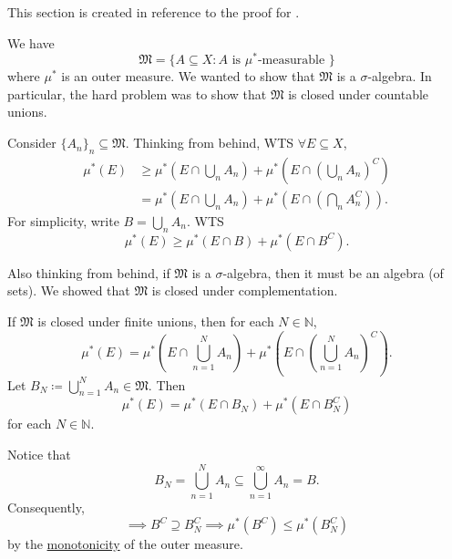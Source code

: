 \documentclass[notoc,notitlepage]{tufte-book}
\begin{document}
This section is created in reference to
the proof for .

We have
\begin{equation*}
  \mathfrak{M} = \{ A \subseteq X : A \text{ is } \mu^*\text{-measurable } \}
\end{equation*}
where $\mu^*$ is an outer measure.
We wanted to show that $\mathfrak{M}$ is a $\sigma$-algebra.
In particular, the hard problem was to show that
$\mathfrak{M}$ is closed under countable unions.

Consider $\{ A_n \}_{n} \subseteq \mathfrak{M}$.
Thinking from behind, WTS $\forall E \subseteq X$,
\begin{align*}
  \mu^*(E)
  &\geq \mu^* \left( E \cap \bigcup_{n} A_n \right)
    + \mu^* \left( E \cap \left( \bigcup_{n} A_n \right)^C \right) \\
  &= \mu^* \left( E \cap \bigcup_{n} A_n \right)
    + \mu^* \left( E \cap \left( \bigcap_{n} A_n^C \right) \right).
\end{align*}
For simplicity, write $B = \bigcup_{n} A_n$.
WTS
\begin{equation}\tag{$*$}\label{eq:appendix_1_eq_1}
  \mu^*(E) \geq \mu^*(E \cap B) + \mu^*(E \cap B^C).
\end{equation}

Also thinking from behind,
if $\mathfrak{M}$ is a $\sigma$-algebra, 
then it must be an algebra (of sets).
We showed that $\mathfrak{M}$ is closed under complementation.

If $\mathfrak{M}$ is closed under finite unions,
then for each $N \in \mathbb{N}$,
\begin{equation*}
  \mu^*(E) = \mu^* \left( E \cap \bigcup_{n=1}^{N} A_n \right)
    + \mu^* \left( E \cap \left( \bigcup_{n=1}^{N} A_n \right)^C \right).
\end{equation*}
Let $B_N \coloneqq \bigcup_{n=1}^{N} A_n \in \mathfrak{M}$. Then
\begin{equation}\tag{$\dagger$}\label{eq:appendix_1_eq_2}
  \mu^*(E) = \mu^* (E \cap B_N) + \mu^* (E \cap B_N^C)
\end{equation}
for each $N \in \mathbb{N}$.

Notice that
\begin{equation*}
  B_N = \bigcup_{n=1}^{N} A_n \subseteq \bigcup_{n=1}^{\infty} A_n = B.
\end{equation*}
Consequently,
\begin{equation*}
  \implies B^C \supseteq B_N^C \implies \mu^*(B^C) \leq \mu^*(B_N^C)
\end{equation*}
by the \hyperref[defn:outer_measure]{monotonicity} of the outer measure.
\end{document}

